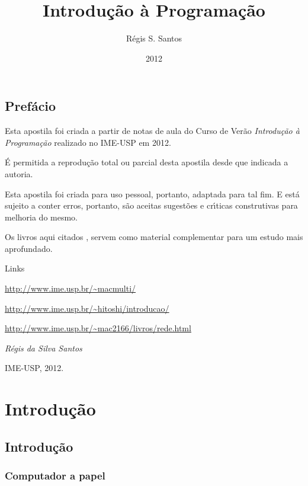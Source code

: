 \documentclass[a4paper]{memoir}
\title{Introdução à Programação}
\author{R\'egis S. Santos}
\date{2012}
\begin{document}
\begin{titlingpage}
  \maketitle
\end{titlingpage}

\tableofcontents

\chapter*{Prefácio}

Esta apostila foi criada a partir de notas de aula do Curso de Verão \emph{Introdução \`a Programação} realizado no IME-USP em 2012.

\'E permitida a reprodu\c{c}\~ao total ou parcial desta apostila desde que indicada a autoria.

Esta apostila foi criada para uso pessoal, portanto, adaptada para tal fim. E est\'a sujeito a conter erros, portanto, s\~ao aceitas sugest\~oes e cr\'{\i}ticas construtivas para melhoria do mesmo.

Os livros aqui citados \cite{ritchie1989c}, \cite{walters1996c} servem como material complementar para um estudo mais aprofundado.

Links

\url{http://www.ime.usp.br/~macmulti/}

\url{http://www.ime.usp.br/~hitoshi/introducao/}

\url{http://www.ime.usp.br/~mac2166/livros/rede.html}

\vfill

\begin{flushright}
\textit{R\'egis da Silva Santos}

IME-USP, 2012.
\end{flushright}


\part{Introdução}

\chapter{Introdução}

\section{Computador a papel}
\end{document}
